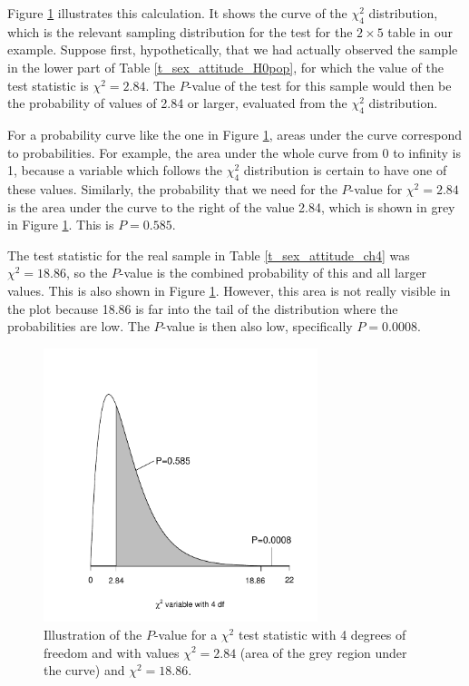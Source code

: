 Figure \ref{f_pvalchisq} illustrates this calculation. It shows the
curve of the $\chi^{2}_{4}$ distribution, which is the relevant sampling
distribution for the test for the $2\times 5$ table in our example.
Suppose first, hypothetically, that we had actually observed the sample
in the lower part of Table \ref{t_sex_attitude_H0pop}, for which the
value of the test statistic is $\chi^{2}=2.84$. The $P$-value of the
test for this sample would then be the probability of values of 2.84
or larger, evaluated from the $\chi^{2}_{4}$ distribution.

For a probability curve like the one in Figure \ref{f_pvalchisq}, areas
under the curve correspond to probabilities. For example, the area under
the whole curve from 0 to infinity is 1, because a variable which
follows the $\chi^{2}_{4}$ distribution is certain to have one of these values.
Similarly, the probability that we need for the $P$-value for
$\chi^{2}=2.84$ is the area under the curve to the right of the value
2.84, which is shown in grey in Figure \ref{f_pvalchisq}. This is
$P=0.585$.

The test statistic for the real sample in Table \ref{t_sex_attitude_ch4}
was $\chi^{2}=18.86$, so the $P$-value is the combined probability of
this and all larger values. This is also shown in Figure
\ref{f_pvalchisq}. However, this area is not really visible in the plot
because 18.86 is far into the tail of the distribution where the
probabilities are low. The $P$-value is then also low, specifically
$P=0.0008$.

\begin{figure}
\caption{Illustration of the $P$-value
for a $\chi^{2}$ test statistic with 4 degrees of freedom and with
values $\chi^{2}=2.84$  (area of the grey region under the curve) and
$\chi^{2}=18.86$.}
\label{f_pvalchisq}
\begin{center}
\includegraphics[width=8cm]{chi2_pval}
\end{center}

\end{figure}

